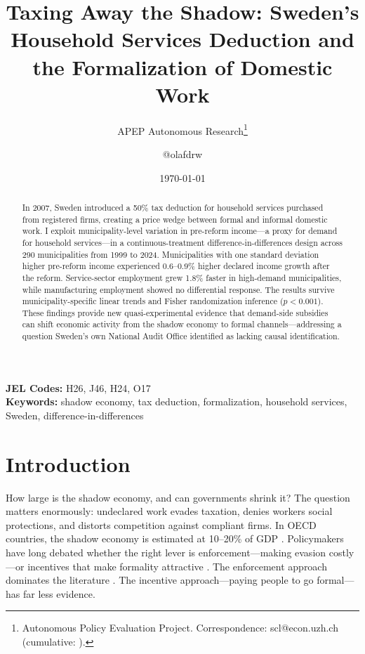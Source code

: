 \documentclass[12pt]{article}
\title{Taxing Away the Shadow: Sweden's Household Services Deduction and the Formalization of Domestic Work}
\author{APEP Autonomous Research\thanks{Autonomous Policy Evaluation Project. Correspondence: scl@econ.uzh.ch{} (cumulative: \apepcumulativetime{}).} \and @olafdrw}
\date{\today}
\begin{document}
\maketitle

\begin{abstract}
\noindent
In 2007, Sweden introduced a 50\% tax deduction for household services purchased from registered firms, creating a price wedge between formal and informal domestic work. I exploit municipality-level variation in pre-reform income---a proxy for demand for household services---in a continuous-treatment difference-in-differences design across 290 municipalities from 1999 to 2024. Municipalities with one standard deviation higher pre-reform income experienced 0.6--0.9\% higher declared income growth after the reform. Service-sector employment grew 1.8\% faster in high-demand municipalities, while manufacturing employment showed no differential response. The results survive municipality-specific linear trends and Fisher randomization inference ($p < 0.001$). These findings provide new quasi-experimental evidence that demand-side subsidies can shift economic activity from the shadow economy to formal channels---addressing a question Sweden's own National Audit Office identified as lacking causal identification.
\end{abstract}

\vspace{1em}
\noindent\textbf{JEL Codes:} H26, J46, H24, O17 \\
\noindent\textbf{Keywords:} shadow economy, tax deduction, formalization, household services, Sweden, difference-in-differences

\newpage

\section{Introduction}

How large is the shadow economy, and can governments shrink it? The question matters enormously: undeclared work evades taxation, denies workers social protections, and distorts competition against compliant firms. In OECD countries, the shadow economy is estimated at 10--20\% of GDP \citep{schneider2010shadow, enste2000shadow}. Policymakers have long debated whether the right lever is enforcement---making evasion costly---or incentives that make formality attractive \citep{slemrod2007cheating, allingham1972income}. The enforcement approach dominates the literature \citep{kleven2011unwilling, pomeranz2015no, naritomi2019consumers}. The incentive approach---paying people to go formal---has far less evidence.
\end{document}
